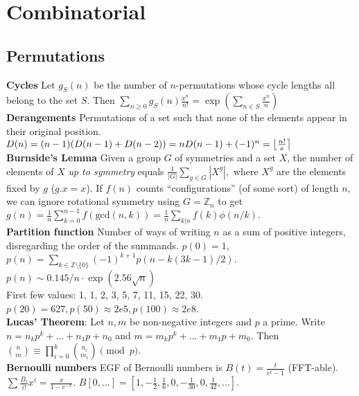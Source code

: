\chapter{Combinatorial}

\section{Permutations}

\textbf{Cycles} Let $g_S(n)$ be the number of $n$-permutations whose cycle lengths all belong to the set $S$. Then $\sum_{n\geq 0} g_S(n) \frac{x^n}{n!} = \exp\left(\sum_{n\in S} \frac{x^n} {n} \right)$\\
\textbf{Derangements} Permutations of a set such that none of the elements appear in their original position. $\mkern-2mu D(n) = (n-1)(D(n-1)+D(n-2)) = n D(n-1)+(-1)^n = \left\lfloor\frac{n!}{e}\right\rceil$\\
\textbf{Burnside's Lemma} Given a group $G$ of symmetries and a set $X$, the number of elements of $X$ \emph{up to symmetry} equals ${\frac {1}{|G|}}\sum _{{g\in G}}|X^{g}|,$ where $X^{g}$ are the elements fixed by $g$ ($g.x = x$). If $f(n)$ counts ``configurations'' (of some sort) of length $n$, we can ignore rotational symmetry using $G = \mathbb Z_n$ to get $g(n) = \frac{1}{n} \sum_{k=0}^{n-1}{f(\text{gcd}(n, k))} = \frac{1}{n} \sum_{k|n}{f(k)\phi(n/k)}.$\\
\textbf{Partition function} Number of ways of writing $n$ as a sum of positive integers, disregarding the order of the summands. $p(0) = 1$, $p(n) = \sum_{k \in \mathbb Z \setminus \{0\}}{(-1)^{k+1} p(n - k(3k-1) / 2)}$. $p(n) \sim 0.145 / n \cdot \exp(2.56 \sqrt{n})$\\
First few values: 1, 1, 2, 3, 5, 7, 11, 15, 22, 30. $p(20) = 627, p(50) \approx 2e5, p(100) \approx 2e8$.\\
\textbf{Lucas' Theorem}: Let $n,m$ be non-negative integers and $p$ a prime. Write $n=n_kp^k+...+n_1p+n_0$ and $m=m_kp^k+...+m_1p+m_0$. Then $\binom{n}{m} \equiv \prod_{i=0}^k\binom{n_i}{m_i} \pmod{p}$.\\
\textbf{Bernoulli numbers} EGF of Bernoulli numbers is $B(t)=\frac{t}{e^t-1}$ (FFT-able). $\sum \frac{B_i}{i!}x^i = \frac{x}{1 - e^{-x}}$. $B[0,\ldots] = [1, -\frac{1}{2}, \frac{1}{6}, 0, -\frac{1}{30}, 0, \frac{1}{42}, \ldots]$.\\
